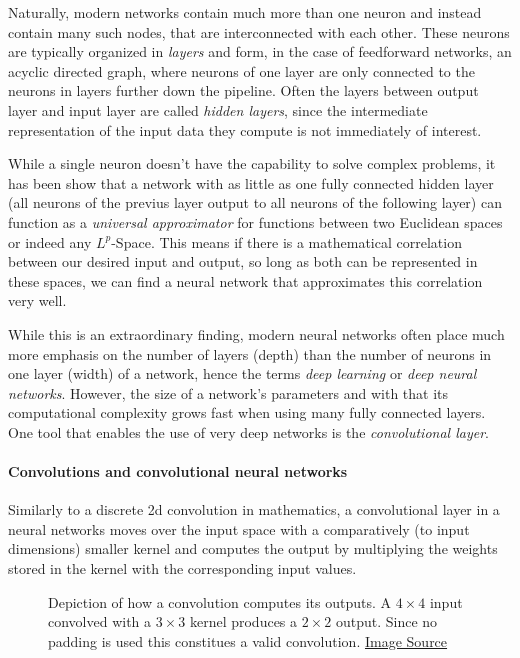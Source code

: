 Naturally, modern networks contain much more than one neuron and instead contain many such nodes, that are interconnected with each other. 
These neurons are typically organized in \emph{layers} and form, in the case of feedforward networks, an acyclic directed graph, where neurons of one layer are only connected to the neurons in layers further down the pipeline. Often the layers between output layer and input layer are called \emph{hidden layers}, since the intermediate representation of the input data they compute is not immediately of interest.

While a single neuron doesn't have the capability to solve complex problems, it has been show that a network with as little as one fully connected hidden layer (all neurons of the previus layer output to all neurons of the following layer) can function as a \emph{universal approximator} for functions between two Euclidean spaces\cite{hornikMultilayerFeedforwardNetworks1989} or indeed any $L^p$-Space\cite{parkMinimumWidthUniversal2020}. This means if there is a mathematical correlation between our desired input and output, so long as both can be represented in these spaces, we can find a neural network that approximates this correlation very well.

While this is an extraordinary finding, modern neural networks often place much more emphasis on the number of layers (depth) than the number of neurons in one layer (width) of a network, hence the terms \emph{deep learning} or \emph{deep neural networks}. However, the size of a network's parameters and with that its computational complexity grows fast when using many fully connected layers. One tool that enables the use of very deep networks is the \emph{convolutional layer}.

\paragraph*{Convolutions and convolutional neural networks}

Similarly to a discrete 2d convolution in mathematics, a convolutional layer in a neural networks moves over the input space with a comparatively (to input dimensions) smaller kernel and computes the output by multiplying the weights stored in the kernel with the corresponding input values.

\begin{figure}[htbp]
    \caption{Depiction of how a convolution computes its outputs. A $4\times 4$ input convolved with a $3\times 3$ kernel produces a $2\times 2$ output. Since no padding is used this constitues a valid convolution. \href{https://fastai.github.io/fastbook2e/images/att_00028.png}{Image Source}}
    \label{fig:convolution}
\end{figure}

